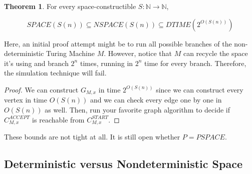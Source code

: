\documentclass{article}
\theoremstyle{definition}
\newtheorem{theorem}{Theorem}[section]
\begin{document}
\begin{theorem}
    For every space-constructible $S: \mathbb{N} \xrightarrow{} \mathbb{N}$,

    \[ SPACE(S(n)) \subseteq NSPACE(S(n)) \subseteq DTIME(2^{O(S(n))})\]
\end{theorem}

Here, an initial proof attempt might be to run all possible branches of the non-deterministic Turing Machine $M$. However, notice that $M$ can recycle the space it's using and branch $2^{n}$ times, running in $2^{n}$ time for every branch. Therefore, the simulation technique will fail.

\begin{proof}
    We can construct $G_{M,x}$ in time $2^{O(S(n))}$ since we can construct every vertex in time $O(S(n))$ and we can check every edge one by one in $O(S(n))$ as well. Then, run your favorite graph algorithm to decide if $C^{ACCEPT}_{M,x}$ is reachable from $C^{START}_{M,x}$.
\end{proof}

These bounds are not tight at all. It is still open whether $P = PSPACE$.

\subsection{Deterministic versus Nondeterministic Space}
\end{document}
